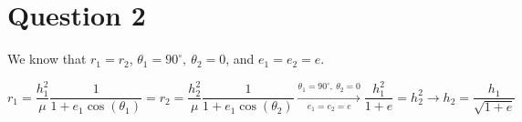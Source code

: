 \section{Question 2}
We know that $r_1 = r_2$, $\theta_1= 90^{\circ}, ~  \theta_2 =0$, and $e_1 = e_2 = e$.

$$
r_1 = \dfrac{h_1^2}{\mu}\dfrac{1}{1+e_1\cos(\theta_1)}  = r_2 = \dfrac{h_2^2}{\mu}\dfrac{1}{1+e_1\cos(\theta_2)}\xrightarrow[e_1 = e_2 = e]{\theta_1= 90^{\circ}, ~  \theta_2 =0} \dfrac{h_1^2}{1+e} = h_2^2 \to h_2 = \dfrac{h_1}{\sqrt{1+e}}
$$